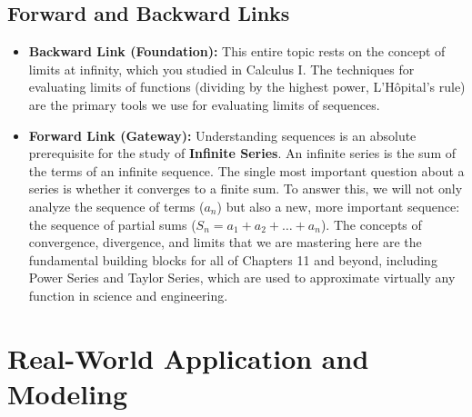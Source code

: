 \documentclass{article}
\begin{document}
\subsection{Forward and Backward Links}
\begin{itemize}
    \item \textbf{Backward Link (Foundation):} This entire topic rests on the concept of limits at infinity, which you studied in Calculus I. The techniques for evaluating limits of functions (dividing by the highest power, L'Hôpital's rule) are the primary tools we use for evaluating limits of sequences.

    \item \textbf{Forward Link (Gateway):} Understanding sequences is an absolute prerequisite for the study of \textbf{Infinite Series}. An infinite series is the sum of the terms of an infinite sequence. The single most important question about a series is whether it converges to a finite sum. To answer this, we will not only analyze the sequence of terms ($a_n$) but also a new, more important sequence: the sequence of partial sums ($S_n = a_1 + a_2 + \dots + a_n$). The concepts of convergence, divergence, and limits that we are mastering here are the fundamental building blocks for all of Chapters 11 and beyond, including Power Series and Taylor Series, which are used to approximate virtually any function in science and engineering.
\end{itemize}

\section{Real-World Application and Modeling}
\end{document}
